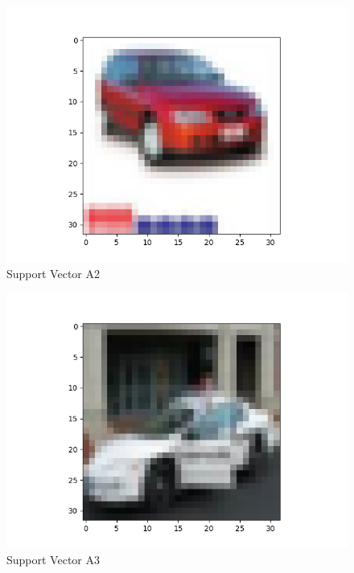 \documentclass[11pt]{article}
\begin{document}
\begin{figure}[H]
\begin{center}
  \includegraphics[scale=0.45]{a2.png}
  \caption{Support Vector A2}
  \label{fig2B}
\end{center}
\end{figure}
\begin{figure}[H]
\begin{center}
  \includegraphics[scale=0.45]{a3.png}
  \caption{Support Vector A3}
  \label{fig2C}
\end{center}
\end{figure}
\end{document}
